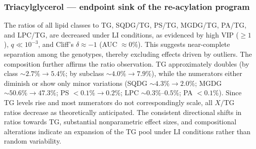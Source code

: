 \documentclass[10pt,letterpaper]{article}
\begin{document}
\subsubsection*{Triacylglycerol — endpoint sink of the re-acylation program}
The ratios of all lipid classes to TG, SQDG/TG, PS/TG, MGDG/TG, PA/TG, and LPC/TG, are decreased under LI conditions, as evidenced by high VIP ($\geq 1$), $q \ll 10^{-3}$, and Cliff's $\delta \approx -1$ (AUC $\approx 0\%$). This suggests near-complete separation among the genotypes, thereby excluding effects driven by outliers. The composition further affirms the ratio observation. TG approximately doubles (by class $\sim 2.7\% \rightarrow 5.4\%$; by subclass $\sim 4.0\% \rightarrow 7.9\%$), while the numerators either diminish or show only minor variations (SQDG $\sim 4.3\% \rightarrow 2.0\%$; MGDG $\sim 50.6\% \rightarrow 47.3\%$; PS $<0.1\% \rightarrow 0.2\%$; LPC $\sim 0.3\%$–$0.5\%$; PA $<0.1\%$). Since TG levels rise and most numerators do not correspondingly scale, all $X/$TG ratios decrease as theoretically anticipated. The consistent directional shifts in ratios towards TG, substantial nonparametric effect sizes, and compositional alterations indicate an expansion of the TG pool under LI conditions rather than random variability.
\end{document}
